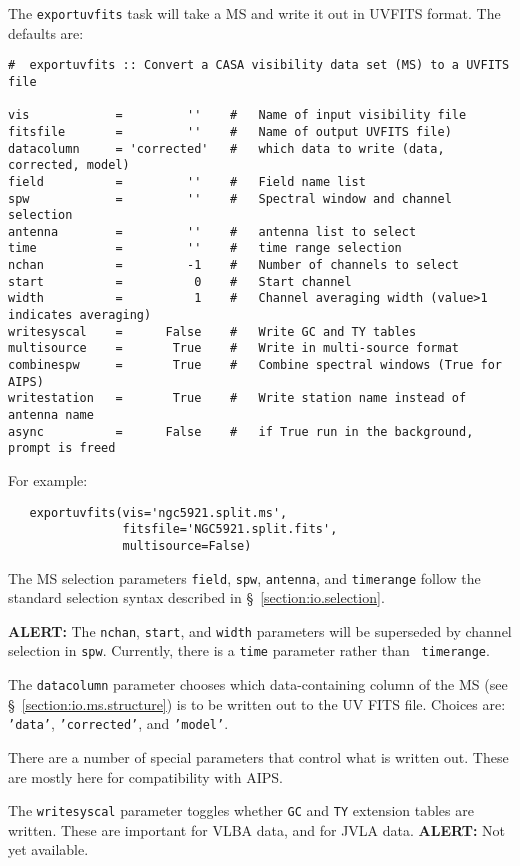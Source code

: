 The {\tt exportuvfits} task will take a MS and write it out in UVFITS
format.  The defaults are:
\small
\begin{verbatim}
#  exportuvfits :: Convert a CASA visibility data set (MS) to a UVFITS file

vis            =         ''    #   Name of input visibility file
fitsfile       =         ''    #   Name of output UVFITS file)
datacolumn     = 'corrected'   #   which data to write (data, corrected, model)
field          =         ''    #   Field name list
spw            =         ''    #   Spectral window and channel selection
antenna        =         ''    #   antenna list to select
time           =         ''    #   time range selection
nchan          =         -1    #   Number of channels to select
start          =          0    #   Start channel
width          =          1    #   Channel averaging width (value>1 indicates averaging)
writesyscal    =      False    #   Write GC and TY tables
multisource    =       True    #   Write in multi-source format
combinespw     =       True    #   Combine spectral windows (True for AIPS)
writestation   =       True    #   Write station name instead of antenna name
async          =      False    #   if True run in the background, prompt is freed
\end{verbatim}
\normalsize

For example:
\small
\begin{verbatim}
   exportuvfits(vis='ngc5921.split.ms',
                fitsfile='NGC5921.split.fits',
                multisource=False)
\end{verbatim}
\normalsize

The MS selection parameters {\tt field}, {\tt spw}, {\tt antenna}, 
and {\tt timerange} follow the standard selection syntax described
in \S~\ref{section:io.selection}.

{\bf ALERT:} The {\tt nchan}, {\tt start}, and {\tt width}
parameters will be superseded by channel selection in {\tt spw}.
Currently, there is a {\tt time} parameter rather than {\tt
  timerange}.

The {\tt datacolumn} parameter chooses which data-containing column
of the MS (see \S~\ref{section:io.ms.structure}) is to be written out
to the UV FITS file.  Choices are: {\tt 'data'}, {\tt 'corrected'}, 
and {\tt 'model'}.

There are a number of special parameters that control what is written
out.  These are mostly here for compatibility with AIPS. 

The {\tt writesyscal} parameter toggles whether {\tt GC} and 
{\tt TY} extension tables are written.  These are important for
VLBA data, and for JVLA data.  {\bf ALERT:} Not yet available.

